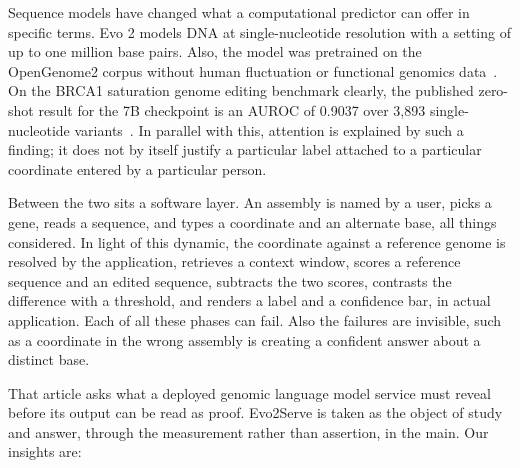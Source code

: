\documentclass[10pt,journal]{IEEEtran}
\begin{document}
Sequence models have changed what a computational predictor can offer in specific terms. Evo 2 models DNA at single-nucleotide resolution with a setting of up to one million base pairs. Also, the model was pretrained on the OpenGenome2 corpus without human fluctuation or functional genomics data~\cite{brixi2026evo2}. On the BRCA1 saturation genome editing benchmark clearly, the published zero-shot result for the 7B checkpoint is an AUROC of 0.9037 over 3{,}893 single-nucleotide variants~\cite{brixi2026evo2}. In parallel with this, attention is explained by such a finding; it does not by itself justify a particular label attached to a particular coordinate entered by a particular person.

Between the two sits a software layer. An assembly is named by a user, picks a gene, reads a sequence, and types a coordinate and an alternate base, all things considered. In light of this dynamic, the coordinate against a reference genome is resolved by the application, retrieves a context window, scores a reference sequence and an edited sequence, subtracts the two scores, contrasts the difference with a threshold, and renders a label and a confidence bar, in actual application. Each of all these phases can fail. Also the failures are invisible, such as a coordinate in the wrong assembly is creating a confident answer about a distinct base.

That article asks what a deployed genomic language model service must reveal before its output can be read as proof. Evo2Serve is taken as the object of study and answer, through the measurement rather than assertion, in the main. Our insights are:
\end{document}
